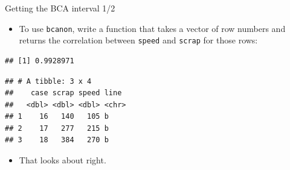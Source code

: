 \documentclass[
  ignorenonframetext,
]{beamer}
\newenvironment{Shaded}{\begin{snugshade}}{\end{snugshade}}
\newcommand{\ControlFlowTok}[1]{\textcolor[rgb]{0.13,0.29,0.53}{\textbf{#1}}}
\newcommand{\DecValTok}[1]{\textcolor[rgb]{0.00,0.00,0.81}{#1}}
\newcommand{\KeywordTok}[1]{\textcolor[rgb]{0.13,0.29,0.53}{\textbf{#1}}}
\newcommand{\NormalTok}[1]{#1}
\newcommand{\OperatorTok}[1]{\textcolor[rgb]{0.81,0.36,0.00}{\textbf{#1}}}
\newcommand{\StringTok}[1]{\textcolor[rgb]{0.31,0.60,0.02}{#1}}
\providecommand{\tightlist}{%
  \setlength{\itemsep}{0pt}\setlength{\parskip}{0pt}}
\begin{document}
\begin{frame}[fragile]{Getting the BCA interval 1/2}
\protect\hypertarget{getting-the-bca-interval-12}{}

\begin{itemize}
\tightlist
\item
  To use \texttt{bcanon}, write a function that takes a vector of row
  numbers and returns the correlation between \texttt{speed} and
  \texttt{scrap} for those rows:
\end{itemize}

\begin{Shaded}
\end{Shaded}

\begin{verbatim}
## [1] 0.9928971
\end{verbatim}

\begin{Shaded}
\end{Shaded}

\begin{verbatim}
## # A tibble: 3 x 4
##    case scrap speed line 
##   <dbl> <dbl> <dbl> <chr>
## 1    16   140   105 b    
## 2    17   277   215 b    
## 3    18   384   270 b
\end{verbatim}

\begin{itemize}
\tightlist
\item
  That looks about right.
\end{itemize}

\end{frame}
\end{document}
